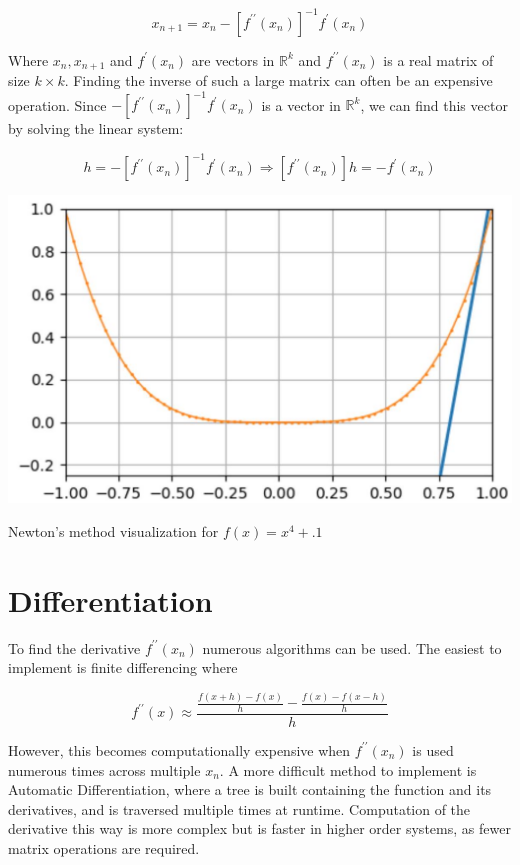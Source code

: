 \documentclass{article}
\begin{document}
$$
x_{n+1}=x_{n}-\left[f^{\prime \prime}\left(x_{n}\right)\right]^{-1} f^{\prime}\left(x_{n}\right)
$$

Where $x_{n}, x_{n+1}$ and $f^{\prime}\left(x_{n}\right)$ are vectors in $\mathbb{R}^{k}$ and $f^{\prime \prime}\left(x_{n}\right)$ is a real matrix of size $k \times k$. Finding the inverse of such a large matrix can often be an expensive operation. Since $-\left[f^{\prime \prime}\left(x_{n}\right)\right]^{-1} f^{\prime}\left(x_{n}\right)$ is a vector in $\mathbb{R}^{k}$, we can find this vector by solving the linear system:

$$
h=-\left[f^{\prime \prime}\left(x_{n}\right)\right]^{-1} f^{\prime}\left(x_{n}\right) \Rightarrow\left[f^{\prime \prime}\left(x_{n}\right)\right] h=-f^{\prime}\left(x_{n}\right)
$$

\begin{center}
\includegraphics[max width=\textwidth]{2025_04_06_546e56f61867917283deg-2}
\end{center}

Newton's method visualization for $f(x)=x^{4}+.1$

\section*{Differentiation}
To find the derivative $f^{\prime \prime}\left(x_{n}\right)$ numerous algorithms can be used. The easiest to implement is finite differencing where

$$
f^{\prime \prime}(x) \approx \frac{\frac{f(x+h)-f(x)}{h}-\frac{f(x)-f(x-h)}{h}}{h}
$$

However, this becomes computationally expensive when $f^{\prime \prime}\left(x_{n}\right)$ is used numerous times across multiple $x_{n}$. A more difficult method to implement is Automatic Differentiation, where a tree is built containing the function and its derivatives, and is traversed multiple times at runtime. Computation of the derivative this way is more complex but is faster in higher order systems, as fewer matrix operations are required.
\end{document}

